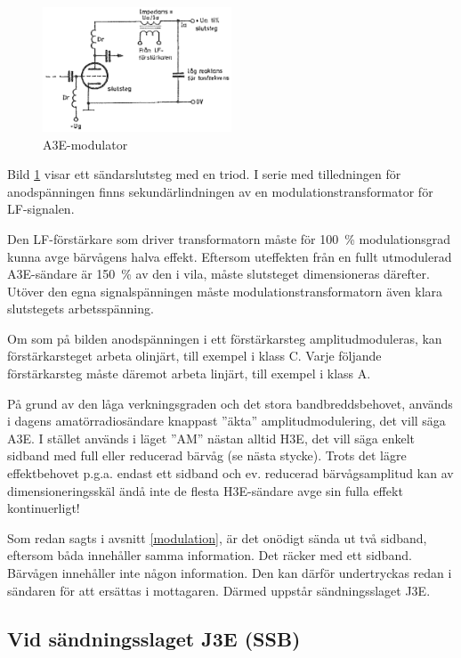 \begin{figure}
\includegraphics[width=0.5\textwidth]{images/cropped_pdfs/bild_2_3-89.pdf}
\caption{A3E-modulator}
\label{fig:BildII3-89}
\end{figure}

Bild \ref{fig:BildII3-89} visar ett sändarslutsteg med en triod.
I serie med tilledningen för anodspänningen finns sekundärlindningen av en
modulationstransformator för LF-signalen.

Den LF-förstärkare som driver transformatorn måste för 100~\% modulationsgrad
kunna avge bärvågens halva effekt.
Eftersom uteffekten från en fullt utmodulerad A3E-sändare är 150~\% av den i
vila, måste slutsteget dimensioneras därefter.
Utöver den egna signalspänningen måste modulationstransformatorn även klara
slutstegets arbetsspänning.

Om som på bilden anodspänningen i ett förstärkarsteg amplitudmoduleras,
kan förstärkarsteget arbeta olinjärt, till exempel i klass C.
Varje följande förstärkarsteg måste däremot arbeta linjärt, till exempel i klass A.

På grund av den låga verkningsgraden och det stora bandbreddsbehovet,
används i dagens amatörradiosändare knappast ''äkta'' amplitudmodulering,
det vill säga A3E.
I stället används i läget ''AM'' nästan alltid H3E, det vill säga enkelt
sidband med full eller reducerad bärvåg (se nästa stycke).
Trots det lägre effektbehovet p.g.a. endast ett sidband och ev. reducerad
bärvågsamplitud kan av dimensioneringsskäl ändå inte de flesta H3E-sändare avge
sin fulla effekt kontinuerligt!

Som redan sagts i avsnitt \ref{modulation}, är det onödigt sända ut två sidband,
eftersom båda innehåller samma information.
Det räcker med ett sidband.
Bärvågen innehåller inte någon information.
Den kan därför undertryckas redan i sändaren för att ersättas i mottagaren.
Därmed uppstår sändningsslaget J3E.

\subsection{Vid sändningsslaget J3E (SSB)}

